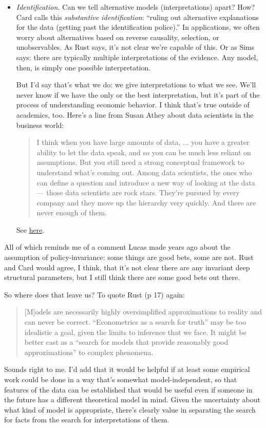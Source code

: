 \documentclass[11pt,letterpaper]{article}
\begin{document}
\begin{itemize}
\item {\it Identification.\/}
Can we tell alternative models (interpretations) apart?  How?
Card calls this {\it substantive identification\/}:
``ruling out alternative explanations for the data (getting past the identification police).''
In applications, we often worry about alternatives based on reverse causality,
selection, or unobservables.
As Rust says, it's not clear we're capable of this.
Or as Sims says:  there are typically multiple interpretations of the evidence.
Any model, then, is simply one possible interpretation.

But I'd say that's what we do:  we give interpretations to what we see.
We'll never know if we have the only or the best interpretation, but it's part
of the process of understanding economic behavior.
I think that's true outside of academics, too.
Here's a line from Susan Athey about data scientists in the business world:
\begin{quote}
I think when you have large amounts of data, ... %
you have a greater ability to let the data speak, and so you can be much less reliant on assumptions. But you still need a strong conceptual framework to understand what's coming out.
Among data scientists, the ones who can define a question and introduce a new way of looking at the data --- those data scientists are rock stars. They're pursued by every company and they move up the hierarchy very quickly.  And there are never enough of them.
\end{quote}
See
\href{http://www.minneapolisfed.org/publications_papers/pub_display.cfm?id=5112}{here}.
\end{itemize}
%
All of which reminds me of a comment Lucas made years ago
about the assumption of policy-invariance:
some things are good bets, some are not.
Rust and Card would agree, I think, that it's not clear there are
any invariant deep structural parameters,
but I still think there are some good bets out there.

So where does that leave us?
To quote Rust (p 17) again:
\begin{quote}
[M]odels are necessarily highly oversimplified approximations to reality and can never be correct.
``Econometrics as a search for truth''
may be too idealistic a goal, given the limits to inference that we face.
It might be better cast as a ``search
for models that provide reasonably good approximations'' to complex phenomena.
\end{quote}
%
Sounds right to me.
I'd add that it would be helpful if at least some empirical work could be
done in a way that's somewhat model-independent,
so that features of the data can be established that would be useful
even if someone in the future has a different theoretical model
in mind.
Given the uncertainty about what kind of model is appropriate,
there's clearly value in separating the search for facts from the search
for interpretations of them.

%
%
%
%

\end{document}
